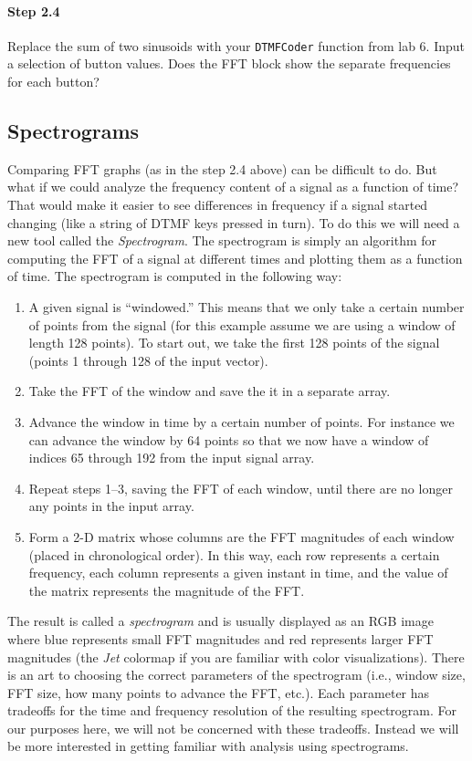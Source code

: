 \paragraph{Step 2.4} Replace the sum of two sinusoids with your
\verb|DTMFCoder| function from lab 6. Input a selection of button
values. Does the FFT block show the separate frequencies for each
button?



\subsection{Spectrograms}

Comparing FFT graphs (as in the step 2.4 above) can be difficult to
do. But what if we could analyze the frequency content of a signal as
a function of time? That would make it easier to see differences in
frequency if a signal started changing (like a string of DTMF keys
pressed in turn). To do this we will need a new tool called the
\emph{Spectrogram}. The spectrogram is simply an algorithm for
computing the FFT of a signal at different times and plotting them as
a function of time. The spectrogram is computed in the following way:

\begin{enumerate}
\item A given signal is ``windowed.'' This means that we only take a
  certain number of points from the signal (for this example assume we
  are using a window of length 128 points). To start out, we take the
  first 128 points of the signal (points 1 through 128 of the input
  vector).
\item Take the FFT of the window and save the it in a separate array.
\item Advance the window in time by a certain number of points. For
  instance we can advance the window by 64 points so that we now have
  a window of indices 65 through 192 from the input signal array.
\item Repeat steps 1--3, saving the FFT of each window, until there
  are no longer any points in the input array.
\item Form a 2-D matrix whose columns are the FFT magnitudes of each
  window (placed in chronological order). In this way, each row
  represents a certain frequency, each column represents a given
  instant in time, and the value of the matrix represents the
  magnitude of the FFT.
\end{enumerate}

The result is called a \emph{spectrogram} and is usually displayed as
an RGB image where blue represents small FFT magnitudes and red
represents larger FFT magnitudes (the \emph{Jet} colormap if you are
familiar with color visualizations). There is an art to choosing the
correct parameters of the spectrogram (i.e., window size, FFT size,
how many points to advance the FFT, etc.). Each parameter has
tradeoffs for the time and frequency resolution of the resulting
spectrogram. For our purposes here, we will not be concerned with
these tradeoffs. Instead we will be more interested in getting
familiar with analysis using spectrograms.

